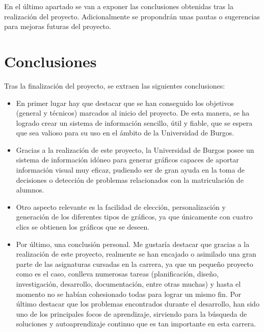 
En el último apartado se van a exponer las conclusiones obtenidas tras la realización del proyecto. Adicionalmente se propondrán unas pautas o sugerencias para mejoras futuras  del proyecto.

\section{Conclusiones}\label{conclusiones}

Tras la finalización del proyecto, se extraen las siguientes conclusiones:

\begin{itemize}
\item En primer lugar hay que destacar que se han conseguido los objetivos (general y técnicos) marcados al inicio del proyecto. De esta manera, se ha logrado crear un sistema de información sencillo, útil y fiable, que se espera que sea valioso para su uso en el ámbito de la Universidad de Burgos. 

\item Gracias a la realización de este proyecto, la Universidad de Burgos posee un sistema de información idóneo para generar gráficos capaces de aportar información visual muy eficaz, pudiendo ser de gran ayuda en la toma de decisiones o detección de problemas relacionados con la matriculación de alumnos. 

\item Otro aspecto relevante es la facilidad de elección, personalización y generación de los diferentes tipos de gráficos, ya que únicamente con cuatro clics se obtienen los gráficos que se deseen.  

\item Por último, una conclusión personal. Me gustaría destacar que gracias a la realización de este proyecto, realmente se han encajado o asimilado una gran parte de las asignaturas cursadas en la carrera, ya que un pequeño proyecto como es el caso, conlleva numerosas tareas (planificación, diseño, investigación, desarrollo, documentación, entre otras muchas) y hasta el momento no se habían cohesionado todas para lograr un mismo fin. Por último destacar que los problemas encontrados durante el desarrollo, han sido uno de los principales focos de aprendizaje, sirviendo para la búsqueda de soluciones y autoaprendizaje continuo que es tan importante en esta carrera.

\end{itemize}



